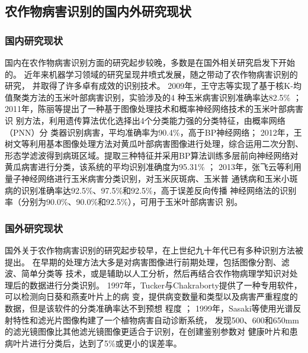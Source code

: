 \subsection{\hei\xiaosan\textbf{农作物病害识别的国内外研究现状}}
  \subsubsection{\hei\sihao\textbf{国内研究现状}}
    国内在农作物病害识别方面的研究起步较晚，多数是在国外相关研究启发下开始的。
    近年来机器学习领域的研究呈现井喷式发展，随之带动了农作物病害识别的研究，
    并取得了许多卓有成效的识别技术。
    2009年，王守志等实现了基于核K-均值聚类方法的玉米叶部病害识别，实验涉及的4
    种玉米病害识别准确率达82.5\% ；
    2011年，陈丽等提出了一种基于图像处理技术和概率神经网络技术的玉米叶部病害识
    别方法，利用遗传算法优化选择出4个分类能力强的分类特征，由概率网络（PNN）分
    类器识别病害，平均准确率为90.4\%，高于BP神经网络；
    2012年，王树文等利用基本图像处理方法对黄瓜叶部病害图像进行处理，综合运用二次分割、
    形态学滤波得到病斑区域。提取三种特征并采用BP算法训练多层前向神经网络对
    黄瓜病害进行分类，该系统的平均识别准确度为95.31\% ；
    2013年，张飞云等利用量子神经网络进行玉米病害分类识别，对玉米灰斑病、玉米普
    通锈病和玉米小斑病的识别准确率达92.5\%、97.5\%和92.5\%，高于误差反向传播
    神经网络法的识别率（分别为90.0\%、90.0\%和92.5\%），可用于玉米叶部病害识
    别。

  \subsubsection{\hei\sihao\textbf{国外研究现状}}
    国外关于农作物病害识别的研究起步较早，在上世纪九十年代已有多种识别方法被提出。
    在早期的处理方法大多是对病害图像进行前期处理，包括图像分割、滤波、简单分类等
    技术，或是辅助以人工分析，然后再结合农作物病理学知识对处理后的数据进行分类识别。
    1997年，Tucker与Chakraborty提供了一种专用软件，可以检测向日葵和燕麦叶片上的病
    变，提供病变数量和类型以及病害严重程度的数据，但是该软件的分类准确率达不到预想
    程度 ；
    1999年，Sasaki等使用光谱反射特性和滤光片图像构建了一个植物病害自动诊断系统，
    发现500、600和650mm的滤光镜图像比其他滤光镜图像更适合于识别，在创建鉴别参数对
    健康叶片和患病叶片进行分类后，达到了5\%或更小的误差率。

